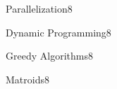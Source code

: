 \documentclass[a4paper]{article}
\begin{document}
\header

\begin{problem}{Parallelization}{8}
\end{problem}

\begin{problem}{Dynamic Programming}{8}
\begin{acode}
\end{acode}
\end{problem}

\begin{problem}{Greedy Algorithms}{8}
\begin{acode}
\end{acode}
\end{problem}

\begin{problem}{Matroids}{8}
\begin{acode}
\end{acode}
\end{problem}
\end{document}
